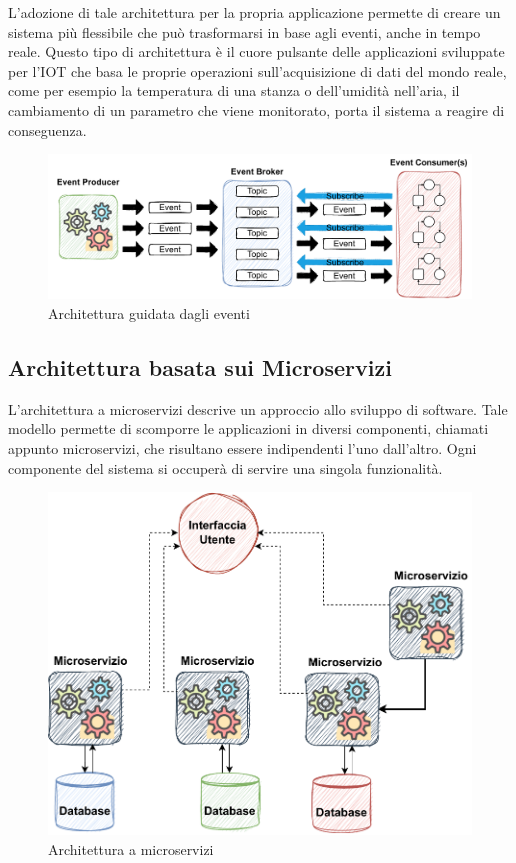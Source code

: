 L'adozione di tale architettura per la propria applicazione permette di creare un sistema più flessibile che può trasformarsi in base agli eventi, anche in tempo reale. Questo tipo di architettura è il cuore pulsante delle applicazioni sviluppate per l'\ac{IOT} che basa le proprie operazioni sull'acquisizione di dati del mondo reale, come per esempio la temperatura di una stanza o dell'umidità nell'aria, il cambiamento di un parametro che viene monitorato, porta il sistema a reagire di conseguenza.

\begin{figure}[h]
    \centering
    \includegraphics[scale = 0.65]{capitoli/immagini/03_architettura_guidata_dagli_eventi.pdf}
    \caption{Architettura guidata dagli eventi}
    \label{fig:architettura_event_driven}
\end{figure}

\subsection{Architettura basata sui Microservizi}
L'architettura a microservizi descrive un approccio allo sviluppo di software. Tale modello permette di scomporre le applicazioni in diversi componenti, chiamati appunto microservizi, che risultano essere indipendenti l'uno dall'altro. Ogni componente del sistema si occuperà di servire una singola funzionalità.

\begin{figure}[h]
    \centering
    \includegraphics[scale = 0.65]{capitoli/immagini/04_architettura_microservizi.pdf}
    \caption{Architettura a microservizi}
    \label{fig:architettura_microservizi}
\end{figure}

